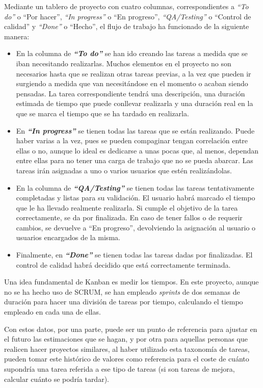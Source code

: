 Mediante un tablero de proyecto con cuatro columnas, correspondientes a \textit{``To do''} o ``Por hacer'', \textit{``In progress''} o ``En progreso'', \textit{``QA/Testing''} o ``Control de calidad'' y \textit{``Done''} o ``Hecho'', el flujo de trabajo ha funcionado de la siguiente manera:
\begin{itemize}
\tightlist
    \item En la columna de \textbf{\textit{``To do''}} se han ido creando las tareas a medida que se iban necesitando realizarlas. Muchos elementos en el proyecto no son necesarios hasta que se realizan otras tareas previas, a la vez que pueden ir surgiendo a medida que van necesitándose en el momento o acaban siendo pensadas. La tarea correspondiente tendrá una descripción, una duración estimada de tiempo que puede conllevar realizarla y una duración real en la que se marca el tiempo que se ha tardado en realizarla.
    \item En \textbf{\textit{``In progress''}} se tienen todas las tareas que se están realizando. Puede haber varias a la vez, pues se pueden compaginar tengan correlación entre ellas o no, aunque lo ideal es dedicarse a unas pocas que, al menos, dependan entre ellas para no tener una carga de trabajo que no se pueda abarcar. Las tareas irán asignadas a uno o varios usuarios que estén realizándolas.
    \item En la columna de \textbf{\textit{``QA/Testing''}} se tienen todas las tareas tentativamente completadas y listas para su validación. El usuario habrá marcado el tiempo que le ha llevado realmente realizarla. Si cumple el objetivo de la tarea correctamente, se da por finalizada. En caso de tener fallos o de requerir cambios, se devuelve a ``En progreso'', devolviendo la asignación al usuario o usuarios encargados de la misma.
    \item Finalmente, en \textbf{\textit{``Done''}} se tienen todas las tareas dadas por finalizadas. El control de calidad habrá decidido que está correctamente terminada.
\end{itemize}

Una idea fundamental de Kanban es medir los tiempos. En este proyecto, aunque no se ha hecho uso de SCRUM, se han empleado \textit{sprints} de dos semanas de duración para hacer una división de tareas por tiempo, calculando el tiempo empleado en cada una de ellas. 

Con estos datos, por una parte, puede ser un punto de referencia para ajustar en el futuro las estimaciones que se hagan, y por otra para aquellas personas que realicen hacer proyectos similares, al haber utilizado esta taxonomía de tareas, pueden tomar este histórico de valores como referencia para el coste de cuánto supondría una tarea referida a ese tipo de
tareas (si son tareas de mejora, calcular cuánto se podría tardar).

